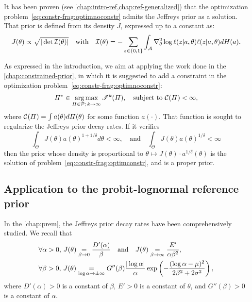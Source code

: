 It has been proven (see \cref{chap:intro-ref,chap:ref-generalized}) that the optimization problem~\eqref{eq:constr-frag:optimnoconstr} admits the Jeffreys prior as a solution. That prior is defined from its density $J$, expressed up to a constant as:
    \begin{equation}
        J(\theta)\propto\sqrt{|\det\mathcal{I}(\theta)|}\quad\text{with}\quad \mathcal{I}(\theta) = -\sum_{z\in\{0,1\}}\int_{\mathcal{A}}\nabla_\theta^2\log\ell(z|a,\theta) \ell(z|a,\theta)dH(a).
    \end{equation}

As expressed in the introduction, we aim at applying the work done in the \cref{chap:constrained-prior}, in which it is suggested to add a constraint in the optimization problem~\eqref{eq:constr-frag:optimnoconstr}:
\begin{equation}\label{eq:constr-frag:optimconstr}
    \varPi^\ast\in\operatorname*{arg\,max}_{\varPi\in\mathcal{P};\,k\rightarrow\infty}\mathscr{I}^k(\varPi),\quad\text{subject to\ }\mathcal{C}(\varPi)<\infty,
\end{equation}
where $\mathcal{C}(\varPi)= \int a(\theta)d\varPi(\theta)$ for some function $a(\cdot)$.
That function is sought to regularize the Jeffreys prior decay rates. If it verifies
    \begin{equation}\label{eq:constr-frag:inta}
        \int_\Theta J(\theta)a(\theta)^{1+1/\delta}d\theta <\infty, \quad\text{and} \quad \int_\Theta J(\theta)a(\theta)^{1/\delta}<\infty 
    \end{equation}
then the prior whose density is proportional to $\theta\mapsto J(\theta)\cdot a^{1/\delta}(\theta)$ is the solution of problem~\eqref{eq:constr-frag:optimconstr}, and is a proper prior.


\subsection{Application to the probit-lognormal reference prior}\label{sec:constr-frags:subsec-constr-in-probit}


In the \cref{chap:prem}, the Jeffreys prior decay rates have been comprehensively studied.
We recall that
    \begin{align}\label{eq:constr-frag:decaysJbeta}
        &\forall\alpha>0,\, J(\theta) \overset{}{\underset{\beta\rightarrow0}{=}}\frac{D'(\alpha)}{\beta}\quad\text{and}\quad J(\theta)\overset{}{\underset{\beta\rightarrow\infty}{=}}\frac{E'}{\alpha\beta^3}, \\
        &\forall\beta>0,\,J(\theta) \overset{}{\underset{\log\alpha\rightarrow\pm\infty}{=}}G''(\beta)\frac{|\log\alpha|}{\alpha}\exp\left(-\frac{(\log\alpha-\mu)^2}{2\beta^2+2\sigma^2}\right),\label{eq:constr-frag:decaysJalpha}
    \end{align}
where $D'(\alpha)>0$ is a constant of $\beta$, $E'>0$ is a constant of $\theta$, and $G''(\beta)>0$ is a constant of $\alpha$.

